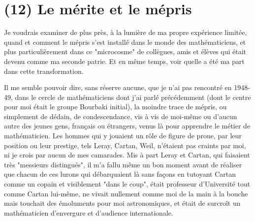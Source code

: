 \section{(12) Le mérite et le mépris}

Je voudrais examiner de plus près, à la lumière de ma propre expérience limitée, quand et comment le mépris s'est installé dans le monde des mathématiciens, et plus particulièrement dans ce "microcosme" de collègues, amis et élèves qui était devenu comme ma seconde patrie. Et en même temps, voir quelle a été ma part dans cette transformation.

Il me semble pouvoir dire, sans réserve aucune, que je n'ai pas rencontré en 1948-49, dans le cercle de mathématiciens dont j'ai parlé précédemment (dont le centre pour moi était le groupe Bourbaki initial), la moindre trace de mépris, ou simplement de dédain, de condescendance, vis à vis de moi-même ou d'aucun autre des jeunes gens, français ou étrangers, venus là pour apprendre le métier de mathématicien. Les hommes qui y jouaient un rôle de figure de proue, par leur position ou leur prestige, tels Leray, Cartan, Weil, n'étaient pas craints par moi, ni je crois par aucun de mes camarades. Mis à part Leray et Cartan, qui faisaient très "messieurs distingués", il m'a fallu même un bon moment avant de réaliser que chacun de ces lurons qui débarquaient là sans façons en tutoyant Cartan comme un copain et visiblement "dans le coup", était professeur d’Université tout comme Cartan lui-même, ne vivait nullement comme moi de la main à la bouche mais touchait des émoluments pour moi astronomiques, et était de surcroît un mathématicien d'envergure et d'audience internationale.

